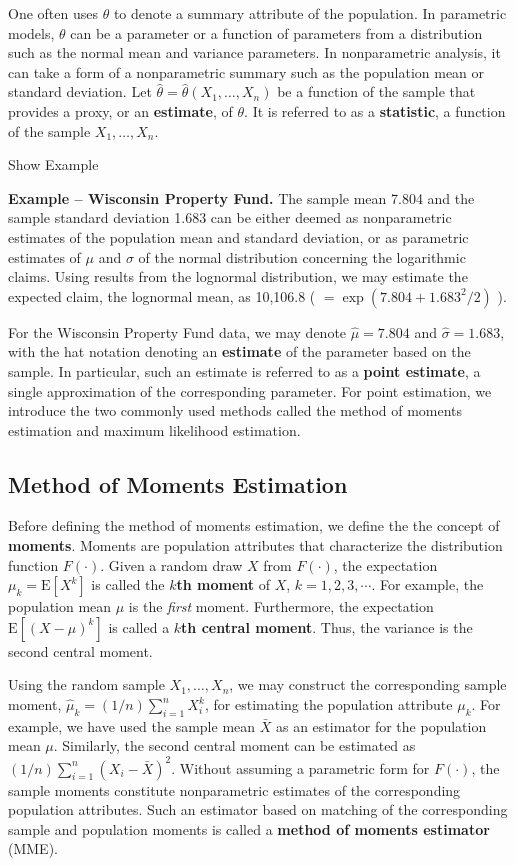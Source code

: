 \documentclass[]{book}
\theoremstyle{definition}
\theoremstyle{definition}
\theoremstyle{definition}
\theoremstyle{remark}
\begin{document}
One often uses \(\theta\) to denote a summary attribute of the
population. In parametric models, \(\theta\) can be a parameter or a
function of parameters from a distribution such as the normal mean and
variance parameters. In nonparametric analysis, it can take a form of a
nonparametric summary such as the population mean or standard deviation.
Let \(\hat{\theta} =\hat{\theta}(X_1, \ldots, X_n)\) be a function of
the sample that provides a proxy, or an \textbf{estimate}, of
\(\theta\). It is referred to as a \textbf{statistic}, a function of the
sample \(X_1, \ldots, X_n\).

Show Example

\hypertarget{EXM:S1:PE}{}
\textbf{Example -- Wisconsin Property Fund.} The sample mean 7.804 and
the sample standard deviation 1.683 can be either deemed as
nonparametric estimates of the population mean and standard deviation,
or as parametric estimates of \(\mu\) and \(\sigma\) of the normal
distribution concerning the logarithmic claims. Using results from the
lognormal distribution, we may estimate the expected claim, the
lognormal mean, as 10,106.8 ( \(=\exp(7.804+1.683^2/2)\) ).

For the Wisconsin Property Fund data, we may denote \(\hat{\mu} =7.804\)
and \(\hat{\sigma} = 1.683\), with the hat notation denoting an
\textbf{estimate} of the parameter based on the sample. In particular,
such an estimate is referred to as a \textbf{point estimate}, a single
approximation of the corresponding parameter. For point estimation, we
introduce the two commonly used methods called the method of moments
estimation and maximum likelihood estimation.

\subsection{Method of Moments
Estimation}\label{method-of-moments-estimation}

Before defining the method of moments estimation, we define the the
concept of \textbf{moments}. Moments are population attributes that
characterize the distribution function \(F(\cdot)\). Given a random draw
\(X\) from \(F(\cdot)\), the expectation \(\mu_k=\mathrm{E}[X^k]\) is
called the \textbf{\(k\)th moment} of \(X\), \(k=1,2,3,\cdots\). For
example, the population mean \(\mu\) is the \emph{first} moment.
Furthermore, the expectation \(\mathrm{E}[(X-\mu)^k]\) is called a
\textbf{\(k\)th central moment}. Thus, the variance is the second
central moment.

Using the random sample \(X_1, \ldots, X_n\), we may construct the
corresponding sample moment, \(\hat{\mu}_k=(1/n)\sum_{i=1}^nX_i^k\), for
estimating the population attribute \(\mu_k\). For example, we have used
the sample mean \(\bar{X}\) as an estimator for the population mean
\(\mu\). Similarly, the second central moment can be estimated as
\((1/n)\sum_{i=1}^n(X_i-\bar{X})^2\). Without assuming a parametric form
for \(F(\cdot)\), the sample moments constitute nonparametric estimates
of the corresponding population attributes. Such an estimator based on
matching of the corresponding sample and population moments is called a
\textbf{method of moments estimator} (MME).
\end{document}
